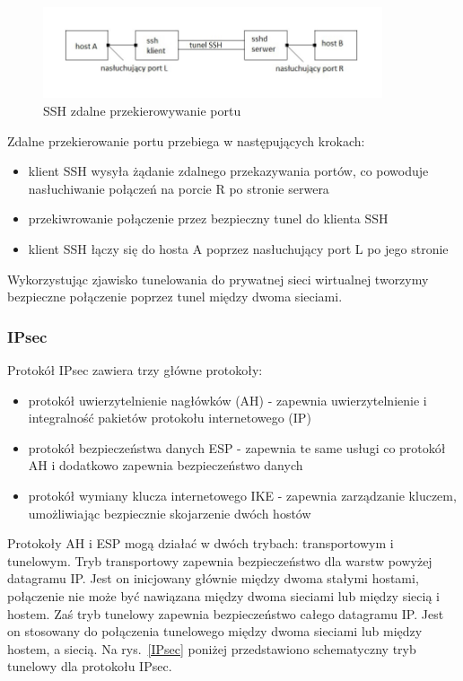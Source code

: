\documentclass[12p]{article}
\begin{document}
\begin{figure}[H]
\centering
\includegraphics[width=10cm]{przekierowywanie_zdalne_SSH.jpg}
\caption{SSH zdalne przekierowywanie portu}\label{SSH_1}
\end{figure}

Zdalne przekierowanie portu przebiega w następujących krokach:
\begin{itemize}
\item klient SSH wysyła żądanie zdalnego przekazywania portów, co powoduje nasłuchiwanie połączeń na porcie R po stronie serwera
\item przekiwrowanie połączenie przez bezpieczny tunel do klienta SSH
\item klient SSH łączy się do hosta A poprzez nasłuchujący port L po jego stronie
\end{itemize}
\quad 
Wykorzystując zjawisko tunelowania do prywatnej sieci wirtualnej tworzymy bezpieczne połączenie poprzez tunel między dwoma sieciami. ~\cite{SSH}

\subsubsection{IPsec}
\quad Protokół IPsec zawiera trzy główne protokoły:
\begin{itemize}
\item protokół uwierzytelnienie nagłówków (AH) - zapewnia uwierzytelnienie i integralność pakietów protokołu internetowego (IP)
\item  protokół bezpieczeństwa danych ESP - zapewnia te same usługi co protokół AH i dodatkowo zapewnia bezpieczeństwo danych
\item protokół wymiany klucza internetowego IKE - zapewnia zarządzanie kluczem, umożliwiając bezpiecznie skojarzenie dwóch hostów 
\end{itemize}
\quad Protokoły AH i ESP mogą działać w dwóch trybach: transportowym i tunelowym. Tryb transportowy zapewnia bezpieczeństwo dla warstw powyżej datagramu IP. Jest on inicjowany głównie między dwoma stałymi hostami, połączenie nie może być nawiązana między dwoma sieciami lub między siecią i hostem. Zaś tryb tunelowy zapewnia bezpieczeństwo całego datagramu IP. Jest on stosowany do połączenia tunelowego między dwoma sieciami lub między hostem, a siecią. Na rys.~\ref{IPsec} poniżej przedstawiono schematyczny tryb tunelowy dla protokołu IPsec.
\end{document}

